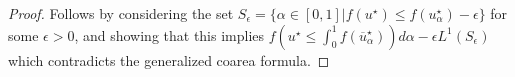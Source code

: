 \begin{proof}
  Follows by considering the set $S_{\epsilon} = \{ \alpha \in [0, 1]
  | f(u^{\star}) \leq f(u^{\star}_{\alpha}) - \epsilon \} $ for some
  $\epsilon > 0$, and showing that this implies $f(u^{\star} \leq
  \int_{0}^{1} f(\overline u_{\alpha}^{\star})) d\alpha - \epsilon
  L^{1}(S_{\epsilon})$ which contradicts the generalized coarea formula.
\end{proof}



